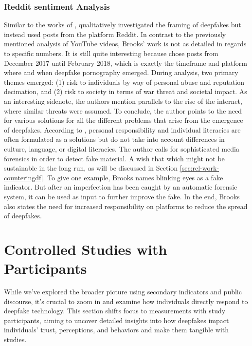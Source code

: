 \documentclass[
  a4paper,  %
  twoside,  %
  bibliography=totoc,
  headsepline,
  cleardoublepage=empty,
  parskip=half,
  draft=false
]{scrbook}
\begin{document}
\subsubsection*{Reddit sentiment Analysis}
Similar to the works of \citeauthor{leeBelieveNotBelieve2021}, \citeauthor{brooksPopularDiscourseDeepfakes2021} qualitatively investigated the framing of deepfakes but instead used posts from the platform Reddit. In contrast to the previously mentioned analysis of YouTube videos, Brooks' work is not as detailed in regards to specific numbers. It is still quite interesting because \citeauthor{brooksPopularDiscourseDeepfakes2021} chose posts from December 2017 until February 2018, which is exactly the timeframe and platform where and when deepfake pornography emerged. During analysis, two primary themes emerged: (1) risk to individuals by way of personal abuse and reputation decimation, and (2) risk to society in terms of war threat and societal impact. As an interesting sidenote, the authors mention parallels to the rise of the internet, where similar threats were assumed. To conclude, the author points to the need for various solutions for all the different problems that arise from the emergence of deepfakes. According to \cite{brooksPopularDiscourseDeepfakes2021}, personal responsibility and individual literacies are often formulated as a solutions but do not take into account differences in culture, language, or digital literacies. The author calls for sophisticated media forensics in order to detect fake material. A wish that which might not be sustainable in the long run, as will be discussed in Section \ref{sec:rel-work-counteringdf}. To give one example, Brooks names blinking eyes as a fake indicator. But after an imperfection has been caught by an automatic forensic system, it can be used as input to further improve the fake. In the end, Brooks also states the need for increased responsibility on platforms to reduce the spread of deepfakes.

\section{Controlled Studies with Participants}
\label{sec:rel-studypart}

While we've explored the broader picture using secondary indicators and public discourse, it's crucial to zoom in and examine how individuals directly respond to deepfake technology. This section shifts focus to measurements with study participants, aiming to uncover detailed insights into how deepfakes impact individuals' trust, perceptions, and behaviors and make them tangible with studies.
\end{document}
